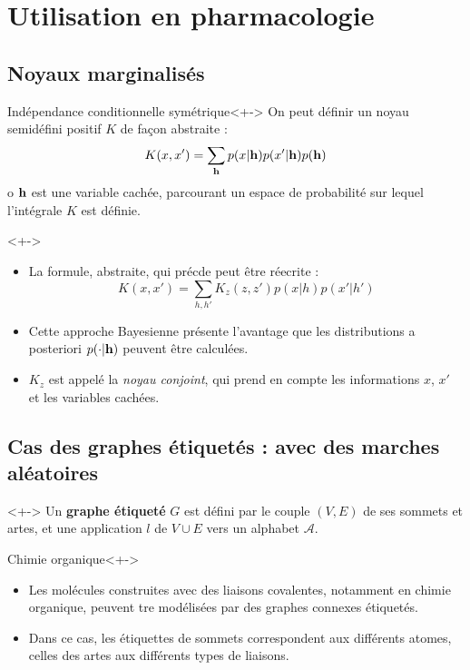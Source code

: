 \section{Utilisation en pharmacologie}

\subsection{Noyaux marginalis\'es}

\begin{frame}
\begin{block}{Ind\'ependance conditionnelle sym\'etrique}<+->
On peut d\'efinir un noyau semid\'efini positif $K$ de fa\c con abstraite :
\[K(x,x')=\sum\limits_{\mathbf{h}}p(x|\mathbf{h})p(x'|\mathbf{h})p(\mathbf{h})\]
o $\mathbf{h}$ est une variable cach\'ee, parcourant un espace de probabilit\'e sur lequel l'int\'egrale $K$ est d\'efinie.
\end{block}
\begin{definition}<+->
\begin{itemize}
\item<+-> La formule, abstraite, qui pr\'ecde peut \^etre r\'eecrite : %
\[K(x,x')=\sum\limits_{h,h'}K_z(z,z')p(x|h)p(x'|h')\]
\item<+-> Cette approche Bayesienne pr\'esente l'avantage que les distributions a posteriori $p(\cdot|\mathbf{h})$ peuvent \^etre calcul\'ees.
\item<+-> $K_z$ est appel\'e la \emph{noyau conjoint}, qui prend en compte les informations $x$, $x'$ et les variables cach\'ees.
\end{itemize}
\end{definition}
\end{frame}

\subsection{Cas des graphes \'etiquet\'es : avec des marches al\'eatoires}

\begin{frame}
\begin{definition}<+->
Un \textbf{graphe \'etiquet\'e} $G$ est d\'efini par le couple $(V,E)$ de ses sommets et artes, et une application $l$ de $V\cup E$ vers un alphabet $\mathcal{A}$.
\end{definition}
\begin{block}{Chimie organique}<+->
\begin{itemize}
\item<+-> Les mol\'ecules construites avec des liaisons covalentes, notamment en chimie organique, peuvent tre mod\'elis\'ees par des graphes connexes \'etiquet\'es.
\item<+-> Dans ce cas, les \'etiquettes de sommets correspondent aux diff\'erents atomes, celles des artes aux diff\'erents types de liaisons.
\end{itemize}
\end{block}
\end{frame}

